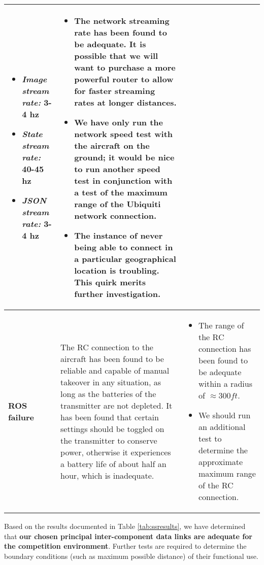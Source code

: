 \documentclass[]{auvsi_doc}
\begin{document}
\begin{center}
\begin{longtable}[H]{|P{3cm}|P{5.75cm}|P{5.75cm}|}
\begin{itemize}
			\item \textit{Image stream rate:} 3-4 hz
			\item \textit{State stream rate:} 40-45 hz
			\item \textit{JSON stream rate:} 3-4 hz
		\end{itemize} &	\begin{itemize}
		\item The network streaming rate has been found to be adequate. It is possible that we will want to purchase a more powerful router to allow for faster streaming rates at longer distances.
		\item We have only run the network speed test with the aircraft on the ground; it would be nice to run another speed test in conjunction with a test of the maximum range of the Ubiquiti network connection.
		\item The instance of never being able to connect in a particular geographical location is troubling. This quirk merits further investigation.
	\end{itemize} \\
		\hline
		\textbf{ROS failure}	& The RC connection to the aircraft has been found to be reliable and capable of manual takeover in any situation, as long as the batteries of the transmitter are not depleted. It has been found that certain settings should be toggled on the transmitter to conserve power, otherwise it experiences a battery life of about half an hour, which is inadequate. & \begin{itemize}
			\item The range of the RC connection has been found to be adequate within a radius of $\approx 300ft$.
			\item We should run an additional test to determine the approximate maximum range of the RC connection.
		\end{itemize} \\
		\hline
	\end{longtable}
\end{center}

Based on the results documented in Table \ref{tab:ssresults}, we have determined that \textbf{our chosen principal inter-component data links are adequate for the competition environment}. Further tests are required to determine the boundary conditions (such as maximum possible distance) of their functional use.
\end{document}
